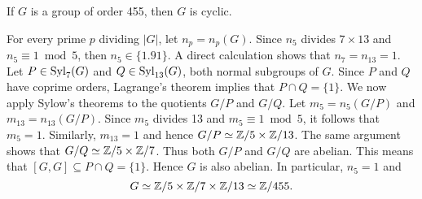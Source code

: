 \begin{example}
If $G$ is a group of order 455, then $G$ is cyclic.

For every prime $p$ dividing $|G|$, let $n_p=n_p(G)$. 
Since $n_5$ divides $7\times 13$ and
$n_5\equiv 1\bmod 5$, then $n_5\in\{1.91\}$. A direct 
calculation shows that $n_7=n_{13}=1$. Let $P\in\mathrm{Syl}_7(G)$ and  $Q\in\mathrm{Syl}_{13}(G)$, both normal subgroups of $G$. Since $P$ and $Q$ 
have coprime orders, Lagrange's theorem implies that 
$P\cap Q=\{1\}$.
We now apply Sylow's theorems to the quotients $G/P$ and $G/Q$.
Let $m_5=n_5(G/P)$ and $m_{13}=n_{13}(G/P)$. Since $m_5$ divides 13 and  $m_5\equiv1\bmod 5$, it follows that 
$m_5=1$. Similarly, $m_{13}=1$ and
hence $G/P\simeq\mathbb{Z}/5\times\mathbb{Z}/13$. The same argument shows that 
$G/Q\simeq\mathbb{Z}/5\times\mathbb{Z}/7$. Thus both $G/P$ and $G/Q$ are abelian. 
This means that 
$[G,G]\subseteq P\cap Q=\{1\}$. Hence $G$ is also abelian. 
In particular, $n_5=1$ and 
\[
G\simeq\mathbb{Z}/5\times\mathbb{Z}/7\times\mathbb{Z}/13\simeq\mathbb{Z}/455.
\]
\end{example}

